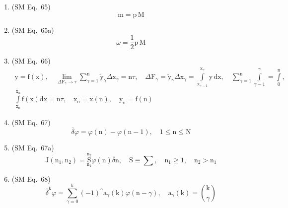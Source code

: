 \documentclass[12pt]{article}
\begin{document}
\begin{enumerate}[label=(\arabic*), series=formellist]
    \item (SM Eq.\ 65) 
    \[
    \mathrm{m} = \mathrm{p}\,\mathrm{M}
    \]

    \item (SM Eq.\ 65a) 
    \[
    \omega = \frac{1}{2}\mathrm{p}\,\mathrm{M}
    \]

    \item (SM Eq.\ 66) 
    \[
    \begin{gathered}
    \mathrm{y} = \mathrm{f}(\mathrm{x}), \quad \lim_{\Delta \mathrm{F}_\gamma \to \tau} \sum_{\gamma=1}^{\mathrm{n}} \tilde{\mathrm{y}}_\gamma \Delta \mathrm{x}_\gamma = \mathrm{n}\tau, \quad \Delta \mathrm{F}_\gamma = \tilde{\mathrm{y}}_\gamma \Delta \mathrm{x}_\gamma = \int\limits_{\mathrm{x}_{\gamma-1}}^{\mathrm{x}_\gamma} \mathrm{y}\,\mathrm{dx}, \quad \sum_{\gamma=1}^{\mathrm{n}} \int\limits_{\gamma-1}^{\gamma} = \int\limits_0^{\mathrm{n}}, \\
    \int\limits_{\mathrm{x}_0}^{\mathrm{x}_{\mathrm{n}}} \mathrm{f}(\mathrm{x})\mathrm{dx} = \mathrm{n}\tau, \quad \mathrm{x}_{\mathrm{n}} = \mathrm{x}(\mathrm{n}), \quad \mathrm{y}_{\mathrm{n}} = \mathrm{f}(\mathrm{n})
    \end{gathered}
    \]

    \item (SM Eq.\ 67) 
    \[
    \bar{\delta}\varphi = \varphi(\mathrm{n}) - \varphi(\mathrm{n}-1), \quad 1 \le \mathrm{n} \le \mathrm{N}
    \]

    \item (SM Eq.\ 67a) 
    \[
    \mathrm{J}(\mathrm{n}_1, \mathrm{n}_2) = \underset{\mathrm{n}_1}{\overset{\mathrm{n}_2}{\mathrm{S}}} \varphi(\mathrm{n})\bar{\delta}\mathrm{n}, \quad \mathrm{S} \equiv \sum, \quad \mathrm{n}_1 \ge 1, \quad \mathrm{n}_2 > \mathrm{n}_1
    \]

    \item (SM Eq.\ 68) 
    \[
    \bar{\delta}^\mathrm{k} \varphi = \sum_{\gamma=0}^\mathrm{k} (-1)^\gamma \mathrm{a}_\gamma(\mathrm{k}) \varphi(\mathrm{n}-\gamma), \quad \mathrm{a}_\gamma(\mathrm{k}) = \binom{\mathrm{k}}{\gamma}
    \]


\end{enumerate}
\end{document}
